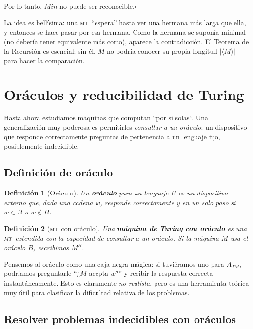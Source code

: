 \documentclass[11pt,a4paper]{article}
\theoremstyle{definicion}
\newtheorem{definicion}{Definición}[section]
\newcommand{\MT}{\textsc{mt}}
\newcommand{\enc}[1]{\langle #1 \rangle}
\begin{document}
Por lo tanto, $\mathit{Min}$ no puede ser reconocible.\hfill$\square$

\begin{intuicion}
La idea es bellísima: una \MT\ ``espera'' hasta ver una hermana más larga que ella, y entonces se hace pasar por esa hermana. Como la hermana se suponía minimal (no debería tener equivalente más corto), aparece la contradicción. El Teorema de la Recursión es esencial: sin él, $M$ no podría conocer su propia longitud $|\enc{M}|$ para hacer la comparación.
\end{intuicion}

\section{Oráculos y reducibilidad de Turing}

Hasta ahora estudiamos máquinas que computan ``por sí solas''. Una generalización muy poderosa es permitirles \emph{consultar a un oráculo}: un dispositivo que responde correctamente preguntas de pertenencia a un lenguaje fijo, posiblemente indecidible.

\subsection{Definición de oráculo}

\begin{definicion}[Oráculo]
Un \textbf{oráculo} para un lenguaje $B$ es un dispositivo externo que, dada una cadena $w$, responde correctamente y en un solo paso si $w \in B$ o $w \notin B$.
\end{definicion}

\begin{definicion}[\MT\ con oráculo]
Una \textbf{máquina de Turing con oráculo} es una \MT\ extendida con la capacidad de consultar a un oráculo. Si la máquina $M$ usa el oráculo $B$, escribimos $M^B$.
\end{definicion}

\begin{intuicion}
Pensemos al oráculo como una caja negra mágica: si tuviéramos uno para $A_{TM}$, podríamos preguntarle ``¿$M$ acepta $w$?'' y recibir la respuesta correcta instantáneamente. Esto es claramente \emph{no realista}, pero es una herramienta teórica muy útil para clasificar la dificultad relativa de los problemas.
\end{intuicion}

\subsection{Resolver problemas indecidibles con oráculos}
\end{document}
